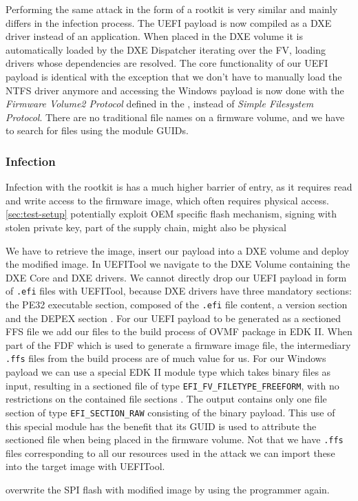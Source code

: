 Performing the same attack in the form of a rootkit is very similar and mainly differs in the infection process.
The \ac{UEFI} payload is now compiled as a \ac{DXE} driver instead of an application.
When placed in the \ac{DXE} volume it is automatically loaded by the \ac{DXE} Dispatcher iterating over the \ac{FV}, loading  drivers whose dependencies are resolved.
The core functionality of our \ac{UEFI} payload is identical with the exception that we don't have to manually load the \ac{NTFS} driver anymore and accessing the Windows payload is now done with the \emph{Firmware Volume2 Protocol} defined in the \cite[Section 3.4.1]{pi-spec}, instead of \emph{Simple Filesystem Protocol}. There are no traditional file names on a firmware volume, and we have to search for files using the module \acp{GUID}.

\subsubsection{Infection}

Infection with the rootkit is has a much higher barrier of entry, as it requires read and write access to the firmware image, which often requires physical access.
\autoref{sec:test-setup} potentially exploit \ac{OEM} specific flash mechanism, signing with stolen private key, part of the supply chain, might also be physical 

We have to retrieve the image, insert our payload into a \ac{DXE} volume and deploy the modified image.
In UEFITool we navigate to the \ac{DXE} Volume containing the \ac{DXE} Core and \ac{DXE} drivers.
We cannot directly drop our \ac{UEFI} payload in form of \lstinline{.efi} files with UEFITool, because \ac{DXE} drivers have three mandatory sections: the \ac{PE32} executable section, composed of the \lstinline{.efi} file content, a version section and the \ac{DEPEX} section \cite[Vol. 3, Section 2.1.4.1.4]{pi-spec}.
For our \ac{UEFI} payload to be generated as a sectioned \ac{FFS} file we add our files to the build process of \ac{OVMF} package in \ac{EDK} II. When part of the \ac{FDF} which is used to generate a firmware image file, the intermediary \lstinline{.ffs} files from the build process are of much value for us.
For our Windows payload we can use a special \ac{EDK} II module type which takes binary files as input, resulting in a sectioned file of type \lstinline{EFI_FV_FILETYPE_FREEFORM}, with no restrictions on the contained file sections \cite[Vol. 3, Section 2.1.4.1.7]{pi-spec}.
The output contains only one file section of type \lstinline{EFI_SECTION_RAW} consisting of the binary payload.
This use of this special module has the benefit that its \ac{GUID} is used to attribute the sectioned file when being placed in the firmware volume.
Not that we have \lstinline{.ffs} files corresponding to all our resources used in the attack we can import these into the target image with UEFITool.

overwrite the SPI flash with modified image by using the programmer again.